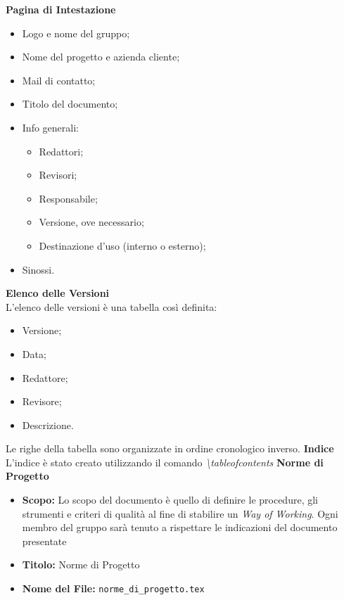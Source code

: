 \documentclass[a4paper, 12pt]{article}
\begin{document}
\textbf{Pagina di Intestazione} 
\begin{itemize}
    \item Logo e nome del gruppo;
    \item Nome del progetto e azienda cliente;
    \item Mail di contatto;
    \item Titolo del documento;
    \item Info generali:
    \begin{itemize}
        \item Redattori;
        \item Revisori;
        \item Responsabile;
        \item Versione, ove necessario;
        \item Destinazione d'uso (interno o esterno);
    \end{itemize}
    \item Sinossi.
\end{itemize}

\textbf{Elenco delle Versioni} \\
L'elenco delle versioni è una tabella così definita:
\begin{itemize}
    \item Versione;
    \item Data;
    \item Redattore;
    \item Revisore;
    \item Descrizione.
\end{itemize}
Le righe della tabella sono organizzate in ordine cronologico inverso. 
\newline \newline
\textbf{Indice} \\
L'indice è stato creato utilizzando il comando \textit{\textbackslash tableofcontents}
\newline \newline
\textbf{Norme di Progetto}
\begin{itemize}
    \item \textbf{Scopo:} Lo scopo del documento è quello di definire le procedure, gli strumenti e criteri di qualità al fine di stabilire un \textit{Way of Working}. Ogni membro del gruppo sarà tenuto a rispettare le indicazioni del documento presentate
    \item \textbf{Titolo:} Norme di Progetto
    \item \textbf{Nome del File:} \texttt{norme\_di\_progetto.tex}
\end{itemize} 
\end{document}
